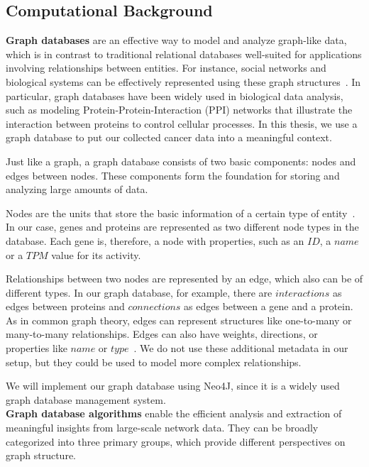 \subsection{Computational Background} \label{subsec:computational_background}
\textbf{Graph databases} are an effective way to model and analyze graph-like data,
which is in contrast to traditional relational databases well-suited for applications involving relationships between entities.
For instance, social networks and biological systems can be effectively represented using these graph structures~\cite{graph_db_survey}.
In particular, graph databases have been widely used in biological data analysis, such as modeling Protein-Protein-Interaction (PPI) networks
that illustrate the interaction between proteins to control cellular processes.
In this thesis, we use a graph database to put our collected cancer data into a meaningful context.

Just like a graph, a graph database consists of two basic components: nodes and edges between nodes.
These components form the foundation for storing and analyzing large amounts of data.

Nodes are the units that store the basic information of a certain type of entity~\cite{graph_db_survey}.
In our case, genes and proteins are represented as two different node types in the database.
Each gene is, therefore, a node with properties, such as an $ID$, a $name$ or a $TPM$ value for its activity.

Relationships between two nodes are represented by an edge, which also can be of different types.
In our graph database, for example, there are $interactions$ as edges between proteins and $connections$ as edges between a gene and a protein.
As in common graph theory, edges can represent structures like one-to-many or many-to-many relationships.
Edges can also have weights, directions, or properties like $name$ or $type$~\cite{graph_db_power_limitations}.
We do not use these additional metadata in our setup, but they could be used to model more complex relationships.

We will implement our graph database using Neo4J, since it is a widely used graph database management system.
\\

\textbf{Graph database algorithms} enable the efficient analysis and extraction of meaningful insights from large-scale network data.
They can be broadly categorized into three primary groups, which provide different perspectives on graph structure.

